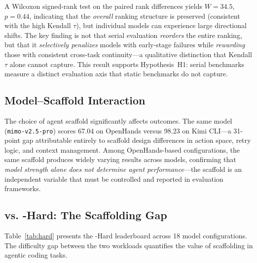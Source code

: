 A Wilcoxon signed-rank test on the paired rank differences yields $W = 34.5$, $p = 0.44$, indicating that the \emph{overall} ranking structure is preserved (consistent with the high Kendall $\tau$), but individual models can experience large directional shifts.
The key finding is not that serial evaluation \emph{reorders} the entire ranking, but that it \emph{selectively penalizes} models with early-stage failures while \emph{rewarding} those with consistent cross-task continuity---a qualitative distinction that Kendall $\tau$ alone cannot capture.
This result supports Hypothesis~H1: serial benchmarks measure a distinct evaluation axis that static benchmarks do not capture.

\subsection{Model--Scaffold Interaction}

The choice of agent scaffold significantly affects outcomes.
The same model (\texttt{mimo-v2.5-pro}) scores 67.04 on OpenHands versus 98.23 on Kimi CLI---a 31-point gap attributable entirely to scaffold design differences in action space, retry logic, and context management.
Among OpenHands-based configurations, the same scaffold produces widely varying results across models, confirming that \emph{model strength alone does not determine agent performance}---the scaffold is an independent variable that must be controlled and reported in evaluation frameworks.

\subsection{\yatcc{} vs. \yatcc{}-Hard: The Scaffolding Gap}

Table~\ref{tab:hard} presents the \yatcc{}-Hard leaderboard across 18 model configurations.
The difficulty gap between the two workloads quantifies the value of scaffolding in agentic coding tasks.

